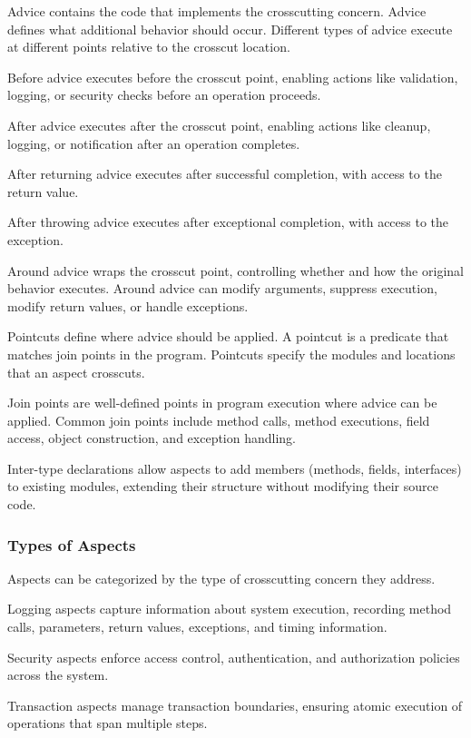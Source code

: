 \documentclass[11pt]{article}
\begin{document}
Advice contains the code that implements the crosscutting concern. Advice defines what additional behavior should occur. Different types of advice execute at different points relative to the crosscut location.

Before advice executes before the crosscut point, enabling actions like validation, logging, or security checks before an operation proceeds.

After advice executes after the crosscut point, enabling actions like cleanup, logging, or notification after an operation completes.

After returning advice executes after successful completion, with access to the return value.

After throwing advice executes after exceptional completion, with access to the exception.

Around advice wraps the crosscut point, controlling whether and how the original behavior executes. Around advice can modify arguments, suppress execution, modify return values, or handle exceptions.

Pointcuts define where advice should be applied. A pointcut is a predicate that matches join points in the program. Pointcuts specify the modules and locations that an aspect crosscuts.

Join points are well-defined points in program execution where advice can be applied. Common join points include method calls, method executions, field access, object construction, and exception handling.

Inter-type declarations allow aspects to add members (methods, fields, interfaces) to existing modules, extending their structure without modifying their source code.

\subsubsection{Types of Aspects}

Aspects can be categorized by the type of crosscutting concern they address.

Logging aspects capture information about system execution, recording method calls, parameters, return values, exceptions, and timing information.

Security aspects enforce access control, authentication, and authorization policies across the system.

Transaction aspects manage transaction boundaries, ensuring atomic execution of operations that span multiple steps.
\end{document}
